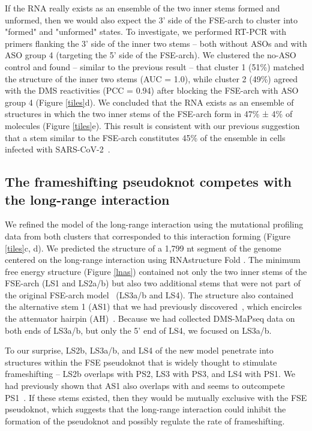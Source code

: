 \documentclass[main.tex]{subfiles}
\begin{document}
If the RNA really exists as an ensemble of the two inner stems formed and unformed, then we would also expect the 3' side of the FSE-arch to cluster into "formed" and "unformed" states.
To investigate, we performed RT-PCR with primers flanking the 3' side of the inner two stems -- both without ASOs and with ASO group 4 (targeting the 5' side of the FSE-arch).
We clustered the no-ASO control and found -- similar to the previous result -- that cluster 1 (51\%) matched the structure of the inner two stems (AUC = 1.0), while cluster 2 (49\%) agreed with the DMS reactivities (PCC = 0.94) after blocking the FSE-arch with ASO group 4 (Figure \ref{tiles}d).
We concluded that the RNA exists as an ensemble of structures in which the two inner stems of the FSE-arch form in 47\% ± 4\% of molecules (Figure \ref{tiles}e).
This result is consistent with our previous suggestion that a stem similar to the FSE-arch constitutes 45\% of the ensemble in cells infected with SARS-CoV-2~\cite{Lan2022}.


\subsection{The frameshifting pseudoknot competes with the long-range interaction}

We refined the model of the long-range interaction using the mutational profiling data from both clusters that corresponded to this interaction forming (Figure \ref{tiles}c, d).
We predicted the structure of a 1,799 nt segment of the genome centered on the long-range interaction using RNAstructure Fold \cite{Mathews2004a}.
The minimum free energy structure (Figure \ref{lnas}) contained not only the two inner stems of the FSE-arch (LS1 and LS2a/b) but also two additional stems that were not part of the original FSE-arch model~\cite{Ziv2020} (LS3a/b and LS4).
The structure also contained the alternative stem 1 (AS1) that we had previously discovered~\cite{Lan2022}, which encircles the attenuator hairpin (AH)~\cite{Su2005}.
Because we had collected DMS-MaPseq data on both ends of LS3a/b, but only the 5' end of LS4, we focused on LS3a/b.

To our surprise, LS2b, LS3a/b, and LS4 of the new model penetrate into structures within the FSE pseudoknot that is widely thought to stimulate frameshifting -- LS2b overlaps with PS2, LS3 with PS3, and LS4 with PS1.
We had previously shown that AS1 also overlaps with and seems to outcompete PS1~\cite{Lan2022}.
If these stems existed, then they would be mutually exclusive with the FSE pseudoknot, which suggests that the long-range interaction could inhibit the formation of the pseudoknot and possibly regulate the rate of frameshifting.
\end{document}

